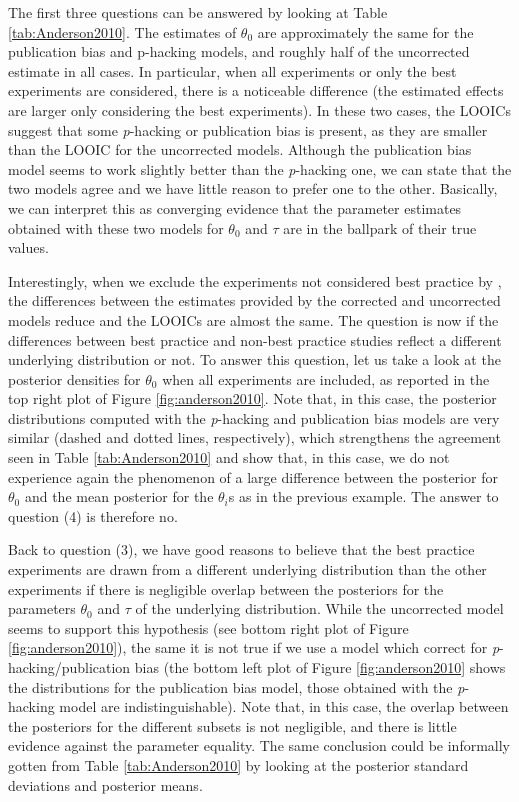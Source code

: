 \documentclass{article}
\theoremstyle{plain}
\theoremstyle{definition}
\begin{document}


The first three questions can be answered by looking at Table \ref{tab:Anderson2010}. The estimates of $\theta_{0}$ are approximately the same for the publication bias and p-hacking models, and roughly half of the uncorrected estimate in all cases. In particular, when all experiments or only the best experiments are considered, there is a noticeable difference (the estimated effects are larger only considering the best experiments). In these two cases, the LOOICs suggest that some \textit{p}-hacking or publication bias is present, as they are smaller than the LOOIC for the uncorrected models. Although the publication bias model seems to work slightly better than the \textit{p}-hacking one, we can state that the two models agree and we have little reason to prefer one to the other. Basically, we can interpret this as converging evidence that the parameter estimates obtained with these two models for $\theta_{0}$ and $\tau$ are in the ballpark of their true values.

Interestingly, when we exclude the experiments not considered best practice by \citet{anderson2010violent}, the differences between the estimates provided by the corrected and uncorrected models reduce and the LOOICs are almost the same. The question is now if the differences between best practice and non-best practice studies reflect a different underlying distribution or not. To answer this question, let us take a look at the posterior densities for $\theta_{0}$ when all experiments are included, as reported in the top right plot of Figure \ref{fig:anderson2010}. Note that, in this case, the posterior distributions computed with the \textit{p}-hacking and publication bias models are very similar (dashed and dotted lines, respectively), which strengthens the agreement seen in Table \ref{tab:Anderson2010} and show that, in this case, we do not experience again the phenomenon of a large difference between the posterior for $\theta_{0}$ and the mean posterior for the $\theta_{i}$s as in the previous example. The answer to question (4) is therefore no.

Back to question (3), we have good reasons to believe that the best practice experiments are drawn from a different underlying distribution than the other experiments if there is negligible overlap between the posteriors for the parameters $\theta_{0}$ and $\tau$ of the underlying distribution. While the uncorrected model seems to support this hypothesis (see bottom right plot of Figure \ref{fig:anderson2010}), the same it is not true if we use a model which correct for \textit{p}-hacking/publication bias (the bottom left plot of Figure \ref{fig:anderson2010} shows the distributions for the publication bias model, those obtained with the \textit{p}-hacking model are indistinguishable). Note that, in this case, the overlap between the posteriors for the different subsets is not negligible, and there is little evidence against the parameter equality. The same conclusion could be informally gotten from Table \ref{tab:Anderson2010} by looking at the posterior standard deviations and posterior means.
\end{document}
